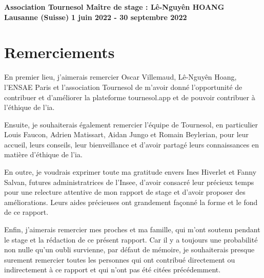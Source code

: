 \documentclass[hidelinks, 12pt]{article}
\begin{document}
\begin{titlingpage}
\vspace{0.4cm}

\noindent \textbf{\Large{Association Tournesol \hfill Maître de stage : Lê-Nguyên HOANG \\ 
\hspace{20mm} Lausanne (Suisse)}} \hfill \textbf{\large{1 juin 2022 - 30 septembre 2022}}

\end{titlingpage}



\renewcommand*\contentsname{Table des matières}
\tableofcontents

\setlength\parskip{0.2 em} %

\pagebreak
{} %
\section*{Remerciements} 

En premier lieu, j'aimerais remercier Oscar Villemaud, Lê-Nguyên Hoang, l'ENSAE Paris et l'association Tournesol de m'avoir donné l'opportunité de contribuer et d'améliorer la plateforme tournesol.app et de pouvoir contribuer à l'éthique de l'\gls{ia}.


Ensuite, je souhaiterais également remercier l'équipe de Tournesol, en particulier Louis Faucon, Adrien Matissart, Aidan Jungo et Romain Beylerian, pour leur accueil, leurs conseils, leur bienveillance et d'avoir partagé leurs connaissances en matière d'éthique de l'\gls{ia}.


En outre, je voudrais exprimer toute ma gratitude envers Ines Hiverlet et Fanny Salvan, futures administratrices de l'Insee, d'avoir consacré leur précieux temps pour une relecture attentive de mon rapport de stage et d'avoir proposer des améliorations. Leurs aides précieuses ont grandement façonné la forme et le fond de ce rapport.


Enfin, j'aimerais remercier mes proches et ma famille, qui m'ont soutenu pendant le stage et la rédaction de ce présent rapport. Car il y a toujours une probabilité non nulle qu'un oubli survienne, par défaut de mémoire, je souhaiterais presque surement remercier toutes les personnes qui ont contribué directement ou indirectement à ce rapport et qui n'ont pas été citées précédemment.
\end{document}
